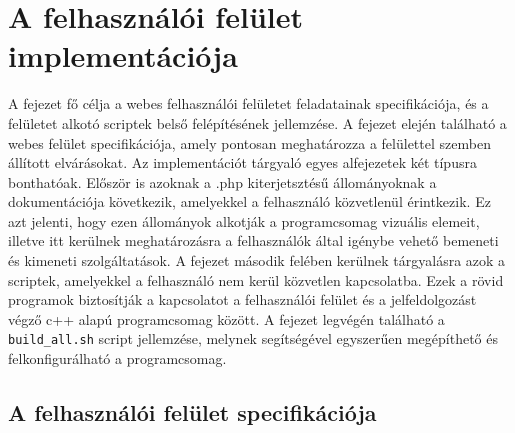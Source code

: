 \documentclass[oneside,titlepage,12pt,a4paper]{report}
\begin{document}
\section{A felhasználói felület implementációja}

A fejezet fő célja a webes felhasználói felületet feladatainak specifikációja, és a felületet alkotó scriptek belső felépítésének jellemzése. A fejezet elején található a webes felület specifikációja, amely pontosan meghatározza a felülettel szemben állított elvárásokat. Az implementációt tárgyaló egyes alfejezetek két típusra bonthatóak. Először is azoknak a .php kiterjetsztésű állományoknak a dokumentációja következik, amelyekkel a felhasználó közvetlenül érintkezik. Ez azt jelenti, hogy ezen állományok alkotják a programcsomag vizuális elemeit, illetve itt kerülnek meghatározásra a felhasználók által igénybe vehető bemeneti és kimeneti szolgáltatások. A fejezet második felében kerülnek tárgyalásra azok a scriptek, amelyekkel a felhasználó nem kerül közvetlen kapcsolatba. Ezek a rövid programok biztosítják a kapcsolatot a felhasználói felület és a jelfeldolgozást végző c++ alapú programcsomag között. A fejezet legvégén található a \texttt{build\_all.sh} script jellemzése, melynek segítségével egyszerűen megépíthető és felkonfigurálható a programcsomag. 

\subsection{A felhasználói felület specifikációja}
\end{document}
